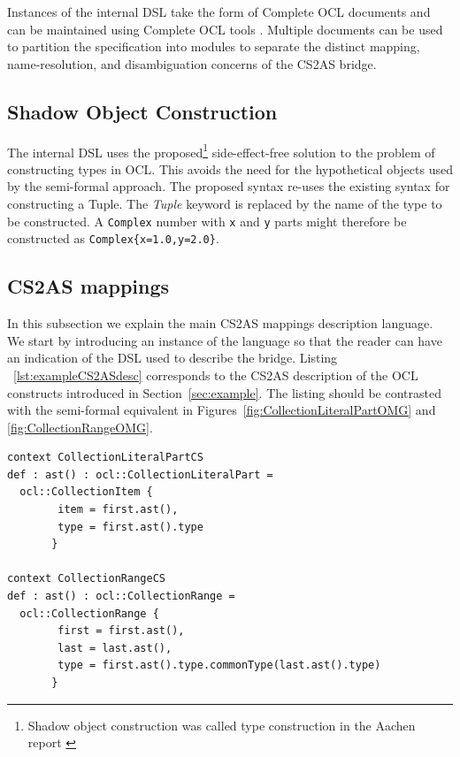 \documentclass{llncs}
\begin{document}
Instances of the internal DSL take the form of Complete OCL documents and can be maintained using Complete OCL tools \cite{eclipseOclOnline}. Multiple documents can be used to partition the specification into modules %
to separate the distinct mapping, name-resolution, and disambiguation concerns of the CS2AS bridge.

\subsection{Shadow Object Construction}
\label{subsec:ShadowExp}

The internal DSL uses the proposed\footnote{Shadow object construction was called type construction in the Aachen report \cite{brucker2013aachenReport}} side-effect-free solution to the problem of constructing types in OCL. This avoids the need for the hypothetical objects used by the semi-formal approach. The proposed syntax re-uses the existing syntax for constructing a Tuple. The \emph{Tuple} keyword is replaced by the name of the type to be constructed. A \verb$Complex$ number with \verb$x$ and \verb$y$ parts might therefore be constructed as \verb$Complex{x=1.0,y=2.0}$. %

\subsection{CS2AS mappings}
\label{subsec:mappings}

In this subsection we explain the main CS2AS mappings description language. We start by introducing an instance of the language so that the reader can have an indication of the DSL used to describe the bridge. Listing ~\ref{lst:exampleCS2ASdesc} corresponds to the CS2AS description of the OCL constructs introduced in Section~\ref{sec:example}. The listing should be contrasted with the semi-formal equivalent in Figures~\ref{fig:CollectionLiteralPartOMG} and \ref{fig:CollectionRangeOMG}.

\begin{lstlisting}[caption=CS2AS description for a collection literal part, label=lst:exampleCS2ASdesc, language=OCL]
context CollectionLiteralPartCS	
def : ast() : ocl::CollectionLiteralPart = 
  ocl::CollectionItem {
        item = first.ast(),	
        type = first.ast().type
       }
  
context CollectionRangeCS	
def : ast() : ocl::CollectionRange = 
  ocl::CollectionRange {
        first = first.ast(),
        last = last.ast(),
        type = first.ast().type.commonType(last.ast().type)
       }
\end{lstlisting}
\end{document}
